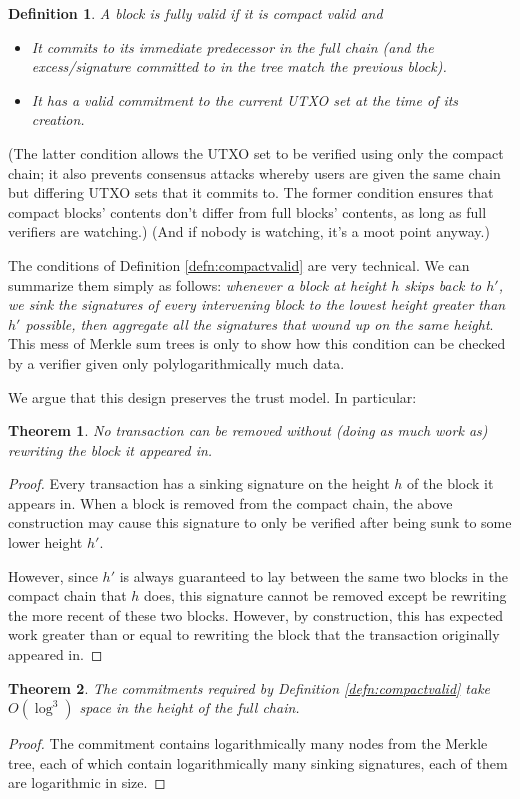 \documentclass[letterpaper]{article}
\newtheorem{thrm}{Theorem}
\newtheorem{defn}{Definition}
\begin{document}
\begin{defn} A block is \emph{fully valid} if it is compact valid and
\begin{itemize}
\item It commits to its immediate predecessor in the full chain (and
the excess/signature committed to in the tree match the previous block).
\item It has a valid commitment to the current UTXO set at the time
of its creation.
\end{itemize}
\end{defn}
(The latter condition allows the UTXO set to be verified using only
the compact chain; it also prevents consensus attacks whereby users
are given the same chain but differing UTXO sets that it commits to.
The former condition ensures that compact blocks' contents don't
differ from full blocks' contents, as long as full verifiers are
watching.) (And if nobody is watching, it's a moot point anyway.)

The conditions of Definition \ref{defn:compactvalid} are very technical.
We can summarize them simply as follows: \emph{whenever a block at height
$h$ skips back to $h'$, we sink the signatures of every intervening block
to the lowest height greater than $h'$ possible, then aggregate all the
signatures that wound up on the same height}. This mess of Merkle sum trees
is only to show how this condition can be checked by a verifier given
only polylogarithmically much data.

We argue that this design preserves the trust model. In particular:
\begin{thrm} No transaction can be removed without (doing as much work
as) rewriting the block it appeared in.\end{thrm}
\begin{proof} Every transaction has a sinking signature on the height
$h$ of the block it appears in. When a block is removed from the compact
chain, the above construction may cause this signature to only be
verified after being sunk to some lower height $h'$.

However, since $h'$ is always guaranteed to lay between the same two
blocks in the compact chain that $h$ does, this signature cannot be
removed except be rewriting the more recent of these two blocks.
However, by construction, this has expected work greater than or
equal to rewriting the block that the transaction originally appeared
in.
\end{proof}

\begin{thrm} The commitments required by Definition \ref{defn:compactvalid}
take $O(\log^3)$ space in the height of the full chain.
\end{thrm}
\begin{proof} The commitment contains logarithmically many nodes from
the Merkle tree, each of which contain logarithmically many sinking
signatures, each of them are logarithmic in size.\end{proof}
\end{document}
